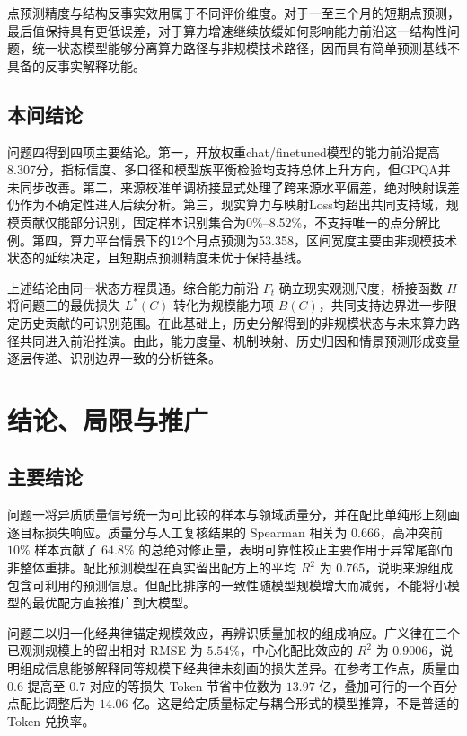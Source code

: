 \documentclass[bwprint]{gmcmthesis}
\begin{document}
点预测精度与结构反事实效用属于不同评价维度。对于一至三个月的短期点预测，最后值保持具有更低误差，对于算力增速继续放缓如何影响能力前沿这一结构性问题，统一状态模型能够分离算力路径与非规模技术路径，因而具有简单预测基线不具备的反事实解释功能。

\subsection{本问结论}

问题四得到四项主要结论。第一，开放权重chat/finetuned模型的能力前沿提高8.307分，指标信度、多口径和模型族平衡检验均支持总体上升方向，但GPQA并未同步改善。第二，来源校准单调桥接显式处理了跨来源水平偏差，绝对映射误差仍作为不确定性进入后续分析。第三，现实算力与映射Loss均超出共同支持域，规模贡献仅能部分识别，固定样本识别集合为0\%--8.52\%，不支持唯一的点分解比例。第四，算力平台情景下的12个月点预测为53.358，区间宽度主要由非规模技术状态的延续决定，且短期点预测精度未优于保持基线。

上述结论由同一状态方程贯通。综合能力前沿 $F_t$ 确立现实观测尺度，桥接函数 $H$ 将问题三的最优损失 $L^*(C)$ 转化为规模能力项 $B(C)$，共同支持边界进一步限定历史贡献的可识别范围。在此基础上，历史分解得到的非规模状态与未来算力路径共同进入前沿推演。由此，能力度量、机制映射、历史归因和情景预测形成变量逐层传递、识别边界一致的分析链条。

\FloatBarrier
\endgroup

\section{结论、局限与推广}

\subsection{主要结论}

问题一将异质质量信号统一为可比较的样本与领域质量分，并在配比单纯形上刻画逐目标损失响应。质量分与人工复核结果的 Spearman 相关为 $0.666$，高冲突前 $10\%$ 样本贡献了 $64.8\%$ 的总绝对修正量，表明可靠性校正主要作用于异常尾部而非整体重排。配比预测模型在真实留出配方上的平均 $R^2$ 为 $0.765$，说明来源组成包含可利用的预测信息。但配比排序的一致性随模型规模增大而减弱，不能将小模型的最优配方直接推广到大模型。

问题二以归一化经典律锚定规模效应，再辨识质量加权的组成响应。广义律在三个已观测规模上的留出相对 RMSE 为 $5.54\%$，中心化配比效应的 $R^2$ 为 $0.9006$，说明组成信息能够解释同等规模下经典律未刻画的损失差异。在参考工作点，质量由 $0.6$ 提高至 $0.7$ 对应的等损失 Token 节省中位数为 $13.97$ 亿，叠加可行的一个百分点配比调整后为 $14.06$ 亿。这是给定质量标定与耦合形式的模型推算，不是普适的 Token 兑换率。
\end{document}
